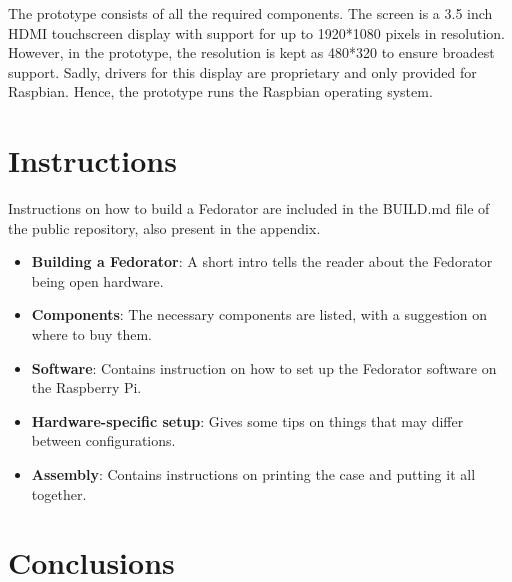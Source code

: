         The prototype consists of all the required components.  The screen is a 3.5 inch HDMI touchscreen display with support for up to 1920*1080 pixels in resolution\cite{aliexpress-touchscreen}.  However, in the prototype, the resolution is kept as 480*320 to ensure broadest support.  Sadly, drivers for this display are proprietary and only provided for Raspbian\cite{osoyoo-drivers}.  Hence, the prototype runs the Raspbian operating system.
        
        
        
    \section{Instructions}
        Instructions on how to build a Fedorator are included in the BUILD.md file of the public repository, also present in the appendix.
        
        \begin{itemize}
            \item \textbf{Building a Fedorator}: A short intro tells the reader about the Fedorator being open hardware.
            \item \textbf{Components}: The necessary components are listed, with a suggestion on where to buy them.
            \item \textbf{Software}: Contains instruction on how to set up the Fedorator software on the Raspberry Pi.
            \item \textbf{Hardware-specific setup}: Gives some tips on things that may differ between configurations.
            \item \textbf{Assembly}: Contains instructions on printing the case and putting it all together.
        \end{itemize}
        
        
        \begin{comment}
        \todo{These are the final instructions that will be the "result" of the work.  Should they be inlined here?}
        \subsection{Bill of Materials}
            \todo{What is needed to get started - include a table and cost}
            \blind[3]
        \subsection{Step-by-step tutorial}
            \todo{The meat: how to build it from grounds up}
            \todo{Will not be present here, rather as an attachment.}
        \end{comment}
    \section{Conclusions}
        
        \blind[2]

